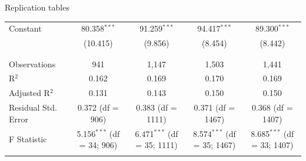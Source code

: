 \documentclass{beamer}
\begin{document}
\begin{frame}{Replication tables}
\begin{table}[!htbp]
{\begin{tabular}{@{\extracolsep{5pt}}lcccc}
 Constant & 80.358$^{***}$ & 91.259$^{***}$ & 94.417$^{***}$ & 89.300$^{***}$ \\ 
  & (10.415) & (9.856) & (8.454) & (8.442) \\ 
  & & & & \\ 
\hline \\[-1.8ex] 
Observations & 941 & 1,147 & 1,503 & 1,441 \\ 
R$^{2}$ & 0.162 & 0.169 & 0.170 & 0.169 \\ 
Adjusted R$^{2}$ & 0.131 & 0.143 & 0.150 & 0.150 \\ 
Residual Std. Error & 0.372 (df = 906) & 0.383 (df = 1111) & 0.371 (df = 1467) & 0.368 (df = 1407) \\ 
F Statistic & 5.156$^{***}$ (df = 34; 906) & 6.471$^{***}$ (df = 35; 1111) & 8.574$^{***}$ (df = 35; 1467) & 8.685$^{***}$ (df = 33; 1407) \\ 
\hline 
\hline \\[-1.8ex] 
\end{tabular} }
\end{table} 
\end{frame}
\end{document}
